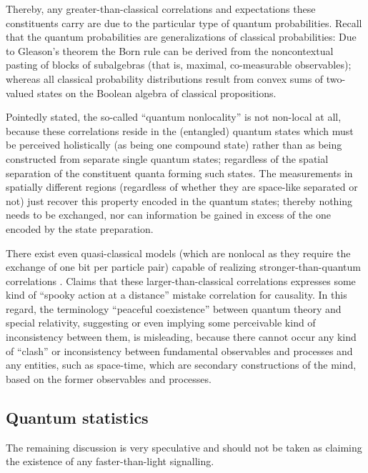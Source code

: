 \documentclass[%
  preprint,
 showpacs,
 showkeys,
 preprintnumbers,
 amsmath,amssymb,
 aps,
  pra,
  longbibliography,
 ]{revtex4-1}
\begin{document}
Thereby, any greater-than-classical correlations and expectations these constituents carry are due to the particular type
of quantum probabilities.
Recall that the quantum probabilities are generalizations of classical probabilities:
Due to Gleason's theorem the Born rule can be derived from
the noncontextual pasting of blocks of subalgebras (that is, maximal, co-measurable observables);
whereas all classical probability distributions result from convex sums of two-valued states on the Boolean algebra of classical propositions.

Pointedly stated, the so-called ``quantum nonlocality'' is not non-local at all, because
these correlations reside in the (entangled) quantum states which must be perceived holistically (as being one compound state)
rather than as being constructed from separate single quantum states; regardless of the spatial separation
of the constituent quanta forming such states.
The measurements in spatially different regions (regardless of whether they are space-like separated or not)
just recover this property encoded in the quantum states;
thereby nothing needs to be exchanged, nor can information be gained in excess
of the one encoded by the state preparation.

There exist even  quasi-classical models
(which are nonlocal as they require the exchange of one bit per particle pair)
capable of realizing stronger-than-quantum correlations \cite{svozil-2004-brainteaser}.
Claims that these larger-than-classical correlations expresses some kind of
``spooky action at a distance'' mistake correlation for causality.
In this regard, the terminology ``peaceful coexistence'' \cite{shimony-78}
between quantum theory and special relativity, suggesting or even
implying some perceivable kind of inconsistency between them,
is misleading, because there cannot occur any kind of ``clash'' or inconsistency between fundamental observables and processes and any entities, such as space-time, which are secondary constructions of the mind, based on the former observables and processes.

\subsection{Quantum statistics}

The remaining discussion is very speculative and should not be taken as claiming the existence of any faster-than-light signalling.
\end{document}
